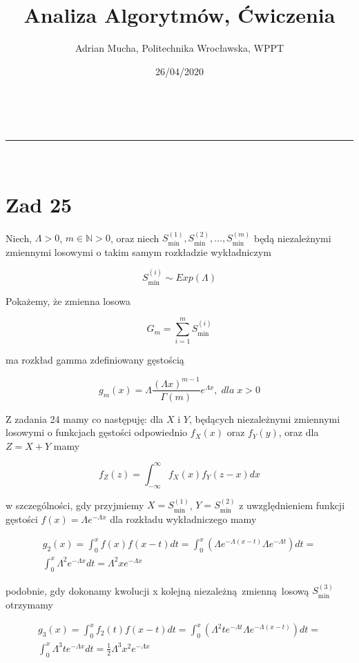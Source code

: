 \documentclass[a4paper,11pt]{article}
\makeatletter
\newcommand{\linia}{\rule{\linewidth}{0.5pt}}
\theoremstyle{mytheor}
\renewcommand{\maketitle}{
\begin{center}
\vspace{2ex}
{\huge \textsc{\@title}}
\vspace{1ex}
\\
\linia\\
\@author \hfill \@date
\vspace{4ex}
\end{center}
}
\makeatother
\begin{document}
\title{Analiza Algorytmów, Ćwiczenia}

\author{Adrian Mucha, Politechnika Wrocławska, WPPT}

\date{26/04/2020}

\maketitle

\section*{Zad 25}
Niech, $\Lambda > 0$, $m \in \mathbb{N} > 0$, oraz niech $S_{\text{min}}^{(1)}, S_{\text{min}}^{(2)},\ldots,S_{\text{min}}^{(m)}$ będą niezależnymi zmiennymi losowymi o takim samym rozkładzie wykładniczym

$$ S_{\text{min}}^{(i)} \sim Exp(\Lambda) $$

Pokażemy, że zmienna losowa

$$ G_m = \sum_{i=1}^m S_{\text{min}}^{(i)} $$

ma rozkład gamma zdefiniowany gęstością

$$ g_m(x) = \Lambda\frac{(\Lambda x)^{m-1}}{\Gamma(m)} e^{\Lambda x},\; dla\;x > 0  $$

Z zadania 24 mamy co następuję: dla $X$ i $Y$, będących niezależnymi zmiennymi losowymi o funkcjach gęstości odpowiednio $f_X(x)$ oraz $f_Y(y)$, oraz dla $Z = X + Y$ mamy

$$ f_Z(z) = \int_{-\infty}^{\infty} f_X(x)f_Y(z - x)dx $$

w szczególności, gdy przyjmiemy $X = S_{\text{min}}^{(1)}$, $Y = S_{\text{min}}^{(2)}$ z uwzględnieniem funkcji gęstości $ f(x) = \Lambda e^{-\Lambda x} $ dla rozkładu wykładniczego mamy

\begin{align*}
    g_2(x) = \int_{0}^{x} f(x)f(x - t)dt = \int_0^x (\Lambda e^{-\Lambda(x-t)} \Lambda e^{-\Lambda t})dt = \\ \int_0^x \Lambda^2e^{-\Lambda x}dt = \Lambda^2xe^{-\Lambda x}
\end{align*}

podobnie, gdy dokonamy kwolucji x kolejną niezależną zmienną losową $S_{\text{min}}^{(3)}$ otrzymamy

\begin{align*}
    g_3(x) = \int_0^x f_2(t)f(x - t)dt = \int_0^x (\Lambda^2te^{-\Lambda t}\Lambda e^{-\Lambda(x-t)})dt = \\
    \int_0^x \Lambda^3te^{-\Lambda x}dt = \frac{1}{2}\Lambda^3x^2e^{-\Lambda x}
\end{align*}
\end{document}
